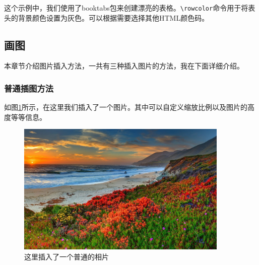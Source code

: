 这个示例中，我们使用了booktabs包来创建漂亮的表格。\verb|\rowcolor|命令用于将表头的背景颜色设置为灰色。可以根据需要选择其他HTML颜色码。
\subsection{画图}
本章节介绍图片插入方法，一共有三种插入图片的方法，我在下面详细介绍。
\subsubsection{普通插图方法}
如图\ref{fig:my_pic1}所示，在这里我们插入了一个图片。其中可以自定义缩放比例以及图片的高度等等信息。
\begin{figure}[hbpt]
    \centering
    \includegraphics[width=0.9\textwidth]{figures/test.jpg}
    \caption{这里插入了一个普通的相片}
    \label{fig:my_pic1}
\end{figure}

